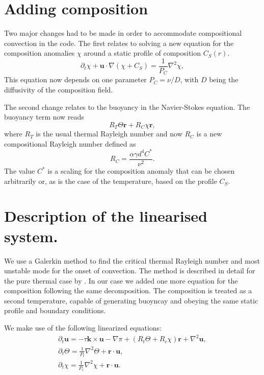 \documentclass[a4paper,10pt]{book}
\renewcommand{\vec}[1]{\mathbf{#1}}
\begin{document}
\section{Adding composition}
Two major changes had to be made in order to accommodate compositional
convection in the code. The first relates to solving a new equation for the
composition anomalies $\chi$ around a static profile of composition $C_S(r)$.
\begin{equation}
\partial_t \chi  + \vec u \cdot \nabla (\chi+C_S) = \frac{1}{P_C} \nabla^2 \chi,
\label{e:composition}
\end{equation}
This equation now depends on one parameter $P_C=\nu/D$, with $D$
being the diffusivity of the composition field.

The second change relates to the buoyancy in the Navier-Stokes equation. The
buoyancy term now reads
\begin{equation}
  R_T \Theta \vec r + R_C \chi \vec r,
\end{equation}
where $R_T$ is the usual thermal Rayleigh number and now $R_C$ is a new
compositional Rayleigh number defined as
\begin{equation}
 R_C = \frac{\alpha \gamma d^4 C^*}{\nu^2}.
\end{equation}
The value $C^*$ is a scaling for the composition anomaly that can be
chosen arbitrarily or, as is the case of the temperature, based on the profile
$C_S$.



\section{Description of the linearised system.}
\label{s:problemSetup}
We use a Galerkin method to find the critical thermal Rayleigh number and most
unstable mode for the onset of convection. The method is described in detail for
the pure thermal case by \citep{ZhangBusse87}. In our case we added one more
equation for the composition following the same decomposition. The composition
is treated as a second temperature, capable of generating buoyncay and obeying
the same static profile and boundary conditions.

We make use of the following linearized equations:
\begin{subequations}
\label{eqs:linearizedConvection}
\begin{gather}
\label{eq:NavierStokes}
\partial_t \vec u = - \tau \vec k \times \vec u - \nabla \pi + (R_t \Theta +R_c \chi )\vec r + \nabla^2 \vec u, \\
\label{eq:temperature}
\partial_t \Theta = \frac{1}{P_t}\nabla^2 \Theta + \vec r \cdot \vec u , \\
\label{eq:composition}
\partial_t \chi = \frac{1}{P_c}\nabla^2 \chi  + \vec r \cdot \vec u .
\end{gather}
\end{subequations}
\end{document}
